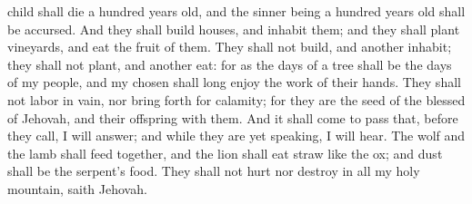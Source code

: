 child shall die a hundred years old, and the sinner being a hundred years old shall be accursed. And they shall build houses, and inhabit them; and they shall plant vineyards, and eat the fruit of them. They shall not build, and another inhabit; they shall not plant, and another eat: for as the days of a tree shall be the days of my people, and my chosen shall long enjoy the work of their hands. They shall not labor in vain, nor bring forth for calamity; for they are the seed of the blessed of Jehovah, and their offspring with them. And it shall come to pass that, before they call, I will answer; and while they are yet speaking, I will hear. The wolf and the lamb shall feed together, and the lion shall eat straw like the ox; and dust shall be the serpent’s food. They shall not hurt nor destroy in all my holy mountain, saith Jehovah. 

